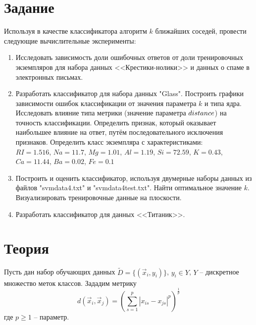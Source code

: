 \documentclass[a4paper,12pt]{article} %
\begin{document}


\section{Задание}
Используя в качестве классификатора алгоритм $k$ ближайших соседей, провести следующие вычислительные эксперименты:
\begin{enumerate}[noitemsep]
    \item Исследовать зависимость доли ошибочных ответов от доли тренировочных экземпляров для набора данных <<Крестики-нолики>> и данных о спаме в электронных письмах.
    \item Разработать классификатор для набора данных "Glass". Построить графики зависимости ошибок классификации от значения параметра $k$ и типа ядра. Исследовать влияние типа метрики (значение параметра $dis\-tance$) на точность классификации. Определить признак, который оказывает наибольшее влияние на ответ, путём последовательного исключения признаков. Определить класс экземпляра с характеристиками: \\
    $RI=1.516$, $Na=11.7$, $Mg=1.01$, $Al=1.19$, $Si=72.59$, $K=0.43$, $Ca=11.44$, $Ba=0.02$, $Fe=0.1$
    \item Построить и оценить классификатор, используя двумерные наборы данных из файлов "svmdata4.txt"\hspace{0pt} и "svmdata4test.txt"\hspace{0pt}. Найти оптимальное значение $k$. Визуализировать тренировочные данные на плоскости.
    \item Разработать классификатор для данных <<Титаник>>.
\end{enumerate}

\section{Теория}
Пусть дан набор обучающих данных $\tilde D = \{(\vec{x}_i, y_i)\}$, $y_i \in Y$, $Y$ -- дискретное множество меток классов. Зададим метрику
\begin{equation}\label{eq:metric}
    d(\vec x_i, \vec x_j) = \left( \sum_{s=1}^p |x_{is} - x_{js}|^p \right)^{\frac{1}{p}}
\end{equation}
где $ p \ge 1 $ -- параметр.
\end{document}
